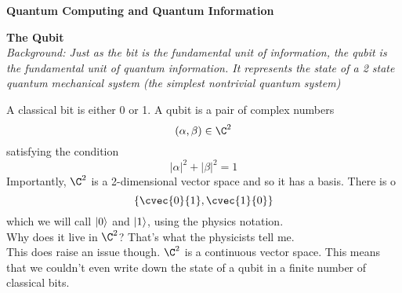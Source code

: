 \documentclass[11pt]{article}
\begin{document}
    \begin{center}
        \textbf{\Large Quantum Computing and Quantum Information} \\
    \end{center}
        \bigskip 

    \textbf{The Qubit} \\
    \textit{Background: Just as the bit is the fundamental unit of information, the qubit is the fundamental unit of quantum information. It represents the state of a 2 state quantum mechanical system (the simplest nontrivial quantum system)}

    A classical bit is either 0 or 1. A qubit is a pair of complex numbers 
    \[
        (\alpha, \beta) \in \C^2 
    \]
    satisfying the condition
    \[
        |\alpha|^2 + |\beta|^2 = 1
    \]
    Importantly, $\C^2$ is a 2-dimensional vector space and so it has a basis. There is o    \[
        \left\{\cvec{0}{1}, \cvec{1}{0}\right\}
    \]
    which we will call $\ket{0}$ and $\ket{1}$, using the physics notation.\\ 

    Why does it live in $\C^2$? That's what the physicists tell me. \\ 
    This does raise an issue though. $\C^2$ is a continuous vector space. This means that we couldn't even write down the state of a qubit in a finite number of classical bits.
\end{document}
